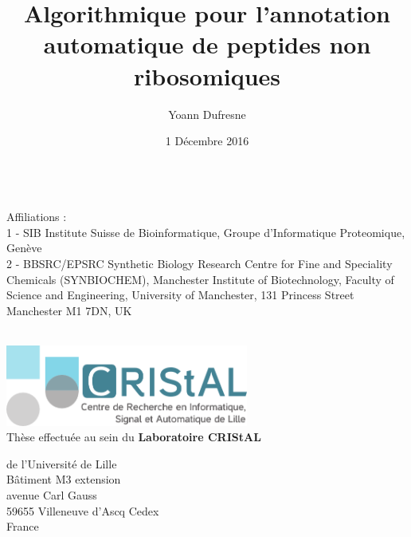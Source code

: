 \documentclass[12pt]{LHSV_thesis}
\begin{document}
\title{Algorithmique pour l'annotation automatique de peptides non ribosomiques}
\author{Yoann Dufresne}
\date{1 Décembre 2016}


\maketitle
\clearpage

~\vspace{3.0cm}\\
Affiliations :\\
1 - SIB Institute Suisse de Bioinformatique, Groupe d'Informatique Proteomique, Genève\\
2 - BBSRC/EPSRC Synthetic Biology Research Centre for Fine and Speciality Chemicals (SYNBIOCHEM), Manchester Institute of Biotechnology, Faculty of Science and Engineering, University of Manchester, 131 Princess Street Manchester M1 7DN, UK


\begin{center}
~\vspace{3.0cm}\\
\thispagestyle{plain}
\includegraphics[width=0.6\textwidth]{logocristal}\vspace{0.5cm}\\
Thèse effectuée au sein du \textbf{Laboratoire CRIStAL}\par 
 de l'Université de Lille\\
Bâtiment M3 extension\\
avenue Carl Gauss\\
59655 Villeneuve d'Ascq Cedex\\
France
\vspace*{\fill}
\clearpage
\end{center}
\end{document}
